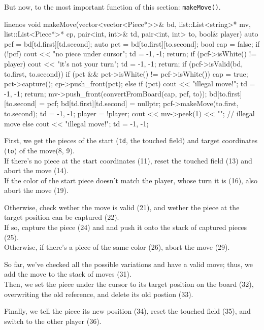 But now, to the most important function of this section: \texttt{makeMove()}.

\begin{cpp*}{linenos}
void makeMove(vector<vector<Piece*>>& bd,
              list::List<string>* mv,
              list::List<Piece*>* cp,
              pair<int, int>& td,
              pair<int, int> to,
              bool& player)
{
  auto pcf = bd[td.first][td.second];
  auto pct = bd[to.first][to.second];
  bool cap = false;
  if (!pcf) {
    cout << "no piece under cursor\n";
    td = {-1, -1};
    return;
  }
  if (pcf->isWhite() != player) {
    cout << "it's not your turn\n";
    td = {-1, -1};
    return;
  }
  if (pcf->isValid(bd, to.first, to.second)) {
    if (pct && pct->isWhite() != pcf->isWhite()) {
      cap = true;
      pct->capture();
      cp->push_front(pct);
    } else if (pct) {
      cout << "illegal move!\n";
      td = {-1, -1};
      return;
    }
    mv->push_front(convertFromBoard(cap, pcf, to));
    bd[to.first][to.second] = pcf;
    bd[td.first][td.second] = nullptr;
    pcf->makeMove(to.first, to.second);
    td = {-1, -1};
    player = !player;
    cout << mv->peek(1) << "\n";
  // illegal move
  } else {
    cout << "illegal move!\n";
    td = {-1, -1};
  }
}
\end{cpp*}

First, we get the pieces of the start (\texttt{td}, the touched field) and target coordinates (\texttt{to})
of the move(8, 9).\\
If there's no piece at the start coordinates (11), reset the touched field (13) and abort the move (14).\\
If the color of the start piece doesn't match the player, whose turn it is (16), also abort the move (19).

Otherwise, check wether the move is valid (21), and wether the piece at the target position can be
captured (22).\\
If so, capture the piece (24) and and push it onto the stack of captured pieces (25).\\
Otherwise, if there's a piece of the same color (26), abort the move (29).

So far, we've checked all the possible variations and have a valid move; thus, we add the move to the
stack of moves (31).\\
Then, we set the piece under the cursor to its target position on the board (32), overwriting the old
reference, and delete its old postion (33).

Finally, we tell the piece its new position (34), reset the touched field (35), and switch to the other
player (36).

